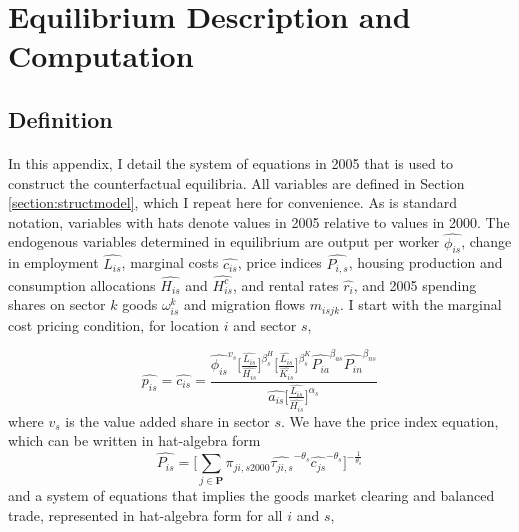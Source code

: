 \documentclass[]{article}
\theoremstyle{plain}
\begin{document}
\clearpage
\newpage
\section{Equilibrium Description and Computation}\label{appendix:eqdefcomp}
\paragraph*{}
\subsection*{Definition}
\paragraph*{}

In this appendix, I detail the system of equations in 2005 that is used to construct the counterfactual equilibria. All variables are defined in Section \ref{section:structmodel}, which I repeat here for convenience. As is standard notation, variables with hats denote values in 2005 relative to values in 2000. The endogenous variables determined in equilibrium are output per worker $\hat{\phi_{is}}$, change in employment $\hat{L_{is}}$, marginal costs $\hat{c_{is}}$, price indices $\hat{P_{i,s}}$, housing production and consumption allocations $\hat{H_{is}}$ and $\hat{H^{c}_{is}}$, and rental rates $\hat{r_{i}}$, and 2005 spending shares on sector $k$ goods $\omega^{k}_{is}$ and migration flows $m_{isjk}$. I start with the marginal cost pricing condition, for location $i$ and sector $s$,

\begin{equation}
	\hat{p_{is}} = \hat{c_{is}} = \frac{\hat{\phi_{is}}^{v_{s}}\bigg[\frac{\hat{L_{is}}}{\hat{H_{is}}}\bigg]^{\beta^{H}_{s}}\bigg[\frac{\hat{L_{is}}}{\hat{K_{is}}}\bigg]^{\beta^{K}_{s}}\hat{P_{ia}}^{\beta_{as}}\hat{P_{in}}^{\beta_{ns}}}{\hat{a_{is}}\bigg[\frac{\hat{L_{is}}}{\hat{H_{is}}}\bigg]^{\alpha_{s}}}	
\end{equation}
where $v_{s}$ is the value added share in sector $s$. We have the price index equation, which can be written in hat-algebra form
\begin{equation}
	\hat{P_{is}} = \bigg[\sum_{j \in \mathbf{P}}\pi_{ji,s2000}\hat{\tau_{ji,s}}^{-\theta_{s}}\hat{c_{js}}^{-\theta_{s}}\bigg]^{-\frac{1}{\theta_{s}}}
\end{equation}
and a system of equations that implies the goods market clearing and balanced trade, represented in hat-algebra form for all $i$ and $s$,
\end{document}
